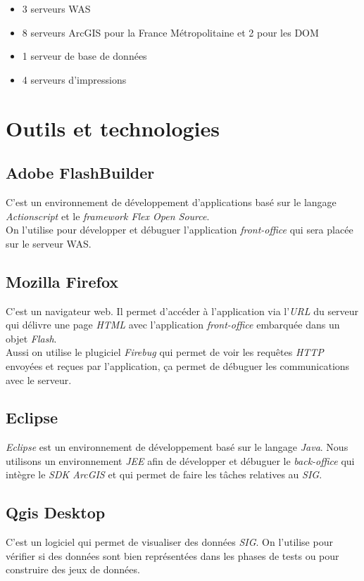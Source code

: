 \begin{itemize}
	\item 3 serveurs WAS
	\item 8 serveurs ArcGIS pour la France Métropolitaine et 2 pour les DOM
	\item 1 serveur de base de données
	\item 4 serveurs d'impressions\\
\end{itemize}
\section{Outils et technologies}
\subsection{Adobe FlashBuilder}
C'est un environnement de développement d'applications basé sur le langage \textit{Actionscript} et le \textit{framework Flex Open Source}.
 \\On l'utilise pour développer et débuguer l'application \textit{front-office} qui sera placée sur le serveur WAS.
\subsection{Mozilla Firefox}
C'est un navigateur web.
 Il permet d'accéder à l'application via l'\textit{URL} du serveur qui délivre une page \textit{HTML} avec l'application \textit{front-office} embarquée dans un objet \textit{Flash}.
 \\Aussi on utilise le plugiciel \textit{Firebug} qui permet de voir les requêtes \textit{HTTP} envoyées et reçues par l'application,
 ça permet de débuguer les communications avec le serveur.
\subsection{Eclipse} \textit{Eclipse} est un environnement de développement basé sur le langage \textit{Java}. Nous utilisons un environnement \textit{JEE} afin de développer et débuguer le \textit{back-office} qui intègre le \textit{SDK ArcGIS} et qui permet de faire
 les tâches relatives au \textit{SIG}.
\subsection{Qgis Desktop} C'est un logiciel qui permet de visualiser des données \textit{SIG}. On l'utilise pour vérifier si des données sont bien représentées dans les phases de tests ou pour construire des jeux de données.

